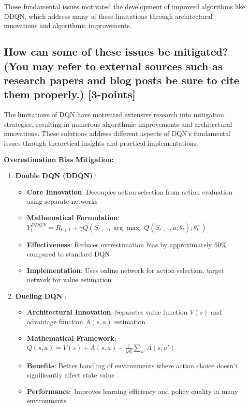 \documentclass[12pt]{article}
\begin{document}
{{{These fundamental issues motivated the development of improved algorithms like DDQN, which address many of these limitations through architectural innovations and algorithmic improvements.

\subsection{How can some of these issues be mitigated? (You may refer to external sources such as research papers and blog posts be sure to cite them properly.) [3-points]}

The limitations of DQN have motivated extensive research into mitigation strategies, resulting in numerous algorithmic improvements and architectural innovations. These solutions address different aspects of DQN's fundamental issues through theoretical insights and practical implementations.

\textbf{Overestimation Bias Mitigation:}

\begin{enumerate}
    \item \textbf{Double DQN (DDQN)} \cite{van2016deep}:
    \begin{itemize}
        \item \textbf{Core Innovation}: Decouples action selection from action evaluation using separate networks
        \item \textbf{Mathematical Formulation}: $Y_t^{DDQN} = R_{t+1} + \gamma Q(S_{t+1}, \arg\max_a Q(S_{t+1}, a; \theta_t); \theta_t^-)$
        \item \textbf{Effectiveness}: Reduces overestimation bias by approximately 50\% compared to standard DQN
        \item \textbf{Implementation}: Uses online network for action selection, target network for value estimation
    \end{itemize}
    
    \item \textbf{Dueling DQN} \cite{wang2016dueling}:
    \begin{itemize}
        \item \textbf{Architectural Innovation}: Separates value function $V(s)$ and advantage function $A(s,a)$ estimation
        \item \textbf{Mathematical Framework}: $Q(s,a) = V(s) + A(s,a) - \frac{1}{|\mathcal{A}|}\sum_{a'} A(s,a')$
        \item \textbf{Benefits}: Better handling of environments where action choice doesn't significantly affect state value
        \item \textbf{Performance}: Improves learning efficiency and policy quality in many environments
    \end{itemize}
\end{enumerate}

}}}
\end{document}

